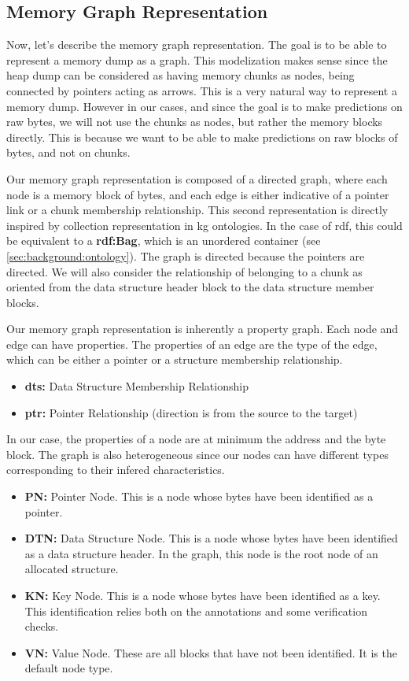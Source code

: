 \subsection{Memory Graph Representation}
Now, let's describe the memory graph representation. The goal is to be able to represent a memory dump as a graph. This modelization makes sense since the heap dump can be considered as having memory chunks as nodes, being connected by pointers acting as arrows. This is a very natural way to represent a memory dump. However in our cases, and since the goal is to make predictions on raw bytes, we will not use the chunks as nodes, but rather the memory blocks directly. This is because we want to be able to make predictions on raw blocks of bytes, and not on chunks. 

Our memory graph representation is composed of a directed graph, where each node is a memory block of bytes, and each edge is either indicative of a pointer link or a chunk membership relationship. This second representation is directly inspired by collection representation in \acrlong{kg} ontologies. In the case of \acrshort{rdf}, this could be equivalent to a \textbf{rdf:Bag}, which is an unordered container \cite{OrderedDataInRDF20} (see \ref{sec:background:ontology}). The graph is directed because the pointers are directed. We will also consider the relationship of belonging to a chunk as oriented from the data structure header block to the data structure member blocks.

Our memory graph representation is inherently a property graph. Each node and edge can have properties. The properties of an edge are the type of the edge, which can be either a pointer or a structure membership relationship.

\begin{itemize}
    \item \textbf{dts:} Data Structure Membership Relationship
    \item \textbf{ptr:} Pointer Relationship (direction is from the source to the target)
\end{itemize}

In our case, the properties of a node are at minimum the address and the byte block.  The graph is also heterogeneous since our nodes can have different types corresponding to their infered characteristics. 

\begin{itemize}
    \item \textbf{PN:} Pointer Node. This is a node whose bytes have been identified as a pointer.
    \item \textbf{DTN:} Data Structure Node. This is a node whose bytes have been identified as a data structure header. In the graph, this node is the root node of an allocated structure.
    \item \textbf{KN:} Key Node. This is a node whose bytes have been identified as a key. This identification relies both on the annotations and some verification checks.
    \item \textbf{VN:} Value Node. These are all blocks that have not been identified. It is the default  node type.
\end{itemize}

